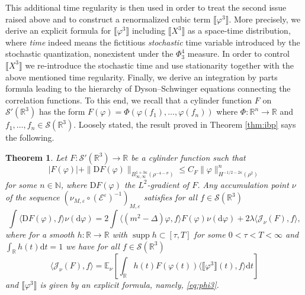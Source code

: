 \documentclass[a4paper,11pt]{article}
\newcommand{\mathD}{\mathrm{D}}
\newcommand{\mathd}{\mathrm{d}}
\newcommand{\tmop}[1]{\ensuremath{\operatorname{#1}}}
\newtheorem{theorem}{Theorem}[section]
\numberwithin{equation}{section}
\begin{document}
This additional time regularity  is then used in order to treat the second issue raised above
and  to construct a renormalized cubic term $\llbracket
\varphi^3 \rrbracket$. More precisely, we derive an explicit formula for $\llbracket \varphi^{3}\rrbracket$ including  $\llbracket X^3 \rrbracket$ as a space-time distribution, where  {\em time} indeed means the fictitious {\em stochastic} time variable introduced by the stochastic quantization, nonexistent under the $\Phi^{4}_{3}$ measure. In order to control $\llbracket X^3 \rrbracket$ we re-introduce the stochastic time and use stationarity together with the above mentioned time regularity.
Finally, we derive an integration by parts formula
 leading to the hierarchy of Dyson--Schwinger equations connecting the correlation functions. 
To this end, we recall that a cylinder function $F$ on $\mathcal{S}' (\mathbb{R}^3)$ has the form $F
(\varphi) = \Phi (\varphi (f_1), \ldots, \varphi (f_n))$ where $\Phi :
\mathbb{R}^n \rightarrow \mathbb{R}$ and $f_1, \ldots, f_n \in \mathcal{S}
(\mathbb{R}^3)$. Loosely stated, the result proved in Theorem \ref{thm:ibp} says the following.

\begin{theorem}
  \label{thm:ibp-int}
  Let $F : \mathcal{S}' (\mathbb{R}^3) \rightarrow \mathbb{R}$
  be a cylinder function such that
  \[ | F (\varphi) | + \| \mathD F (\varphi) \|_{B_{\infty, \infty}^{1 + 3
     \kappa} (\rho^{- 4 - \sigma})} \leqslant C_F \| \varphi \|_{H^{- 1 / 2 -
    2 \kappa} (\rho^2)}^n \]
  for some $n \in \mathbb{N}$, where $\mathD F (\varphi)$  the $L^2$-gradient of $F$. Any accumulation point $\nu$ of the sequence $(\nu_{M,
  \varepsilon} \circ (\mathcal{E}^{\varepsilon})^{- 1})_{M, \varepsilon}$
  satisfies for all $f\in \mathcal{S}(\mathbb{R}^{3})$
  \begin{equation*}
    \int \langle\mathD F (\varphi),f\rangle \nu (\mathd \varphi) = 2 \int \langle(m^2 - \Delta)
    \varphi,f\rangle F (\varphi) \nu (\mathd \varphi) + 2\lambda \langle\mathcal{J}_{\nu} (F),f\rangle,
  \end{equation*}
  where for a smooth $h : \mathbb{R} \rightarrow \mathbb{R}$ 
with $\tmop{supp} h \subset [\tau, T]$ for some $0 < \tau < T < \infty$ and
 $\int_{\mathbb{R}} h (t) \mathd t = 1$ we have for all $f\in \mathcal{S}(\mathbb{R}^{3})$
  \[ \langle\mathcal{J}_{\nu} (F),f\rangle
   =\mathbb{E}_{\nu} \left[ \int_{\mathbb{R}} h (t) F (\varphi (t))\langle \llbracket
   \varphi^3 \rrbracket (t) ,f\rangle\mathd t \right]
    \]
    and $\llbracket \varphi^{3}\rrbracket$ is given by an explicit formula, namely, \eqref{eq:phi3}.
\end{theorem}
\end{document}
